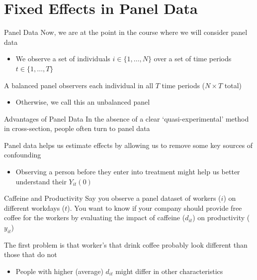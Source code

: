 \documentclass[aspectratio=169,t,11pt,table]{beamer}
\begin{document}
\section{Fixed Effects in Panel Data}

\begin{frame}{Panel Data}
  Now, we are at the point in the course where we will consider panel data
  \begin{itemize}
    \item We observe a set of individuals $i \in \{ 1, \dots, N \}$ over a set of time periods $t \in \{ 1, \dots, T \}$
  \end{itemize}
  
  \bigskip

  \bigskip
  A \alert{balanced panel} observers each individual in all $T$ time periods ($N \times T$ total)
  \begin{itemize}
    \item Otherwise, we call this an \alert{unbalanced panel}
  \end{itemize}

\end{frame}

\begin{frame}{Advantages of Panel Data}
  In the absence of a clear `quasi-experimental' method in cross-section, people often turn to panel data

  \bigskip
  Panel data helps us estimate effects by allowing us to remove some key sources of confounding
  \begin{itemize}
    \item Observing a person before they enter into treatment might help us better understand their $Y_{it}(0)$ 
  \end{itemize}
\end{frame}

\begin{frame}{Caffeine and Productivity}
  Say you observe a panel dataset of workers ($i$) on different workdays ($t$).
  You want to know if your company should provide free coffee for the workers by evaluating the impact of caffeine ($d_{it}$) on productivity ($y_{it}$)
  
  
  \Hugeskip
  The first problem is that worker's that drink coffee probably look different than those that do not
  \begin{itemize}
    \item People with higher (average) $d_{it}$ might differ in other characteristics
  \end{itemize}
\end{frame}
\end{document}
